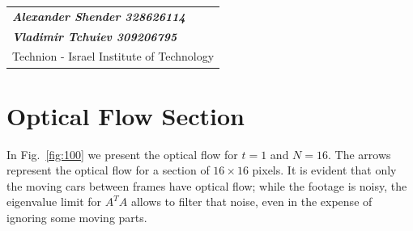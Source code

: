 \documentclass[a4paper]{iacas}
\begin{document}
\begin{tabular}{l}
\\
{\bf\textit{Alexander Shender 328626114}} \\
{\bf\textit{Vladimir Tchuiev 309206795}} \\
Technion - Israel Institute of Technology
\end{tabular}

\vspace{2em}

\section{Optical Flow Section}

In Fig.~\ref{fig:100} we present the optical flow for $t=1$ and $N=16$. The arrows represent the optical flow for a section of $16 \times 16$ pixels. It is evident that only the moving cars between frames have optical flow; while the footage is noisy, the eigenvalue limit for $A^T A$ allows to filter that noise, even in the expense of ignoring some moving parts.
\end{document}

